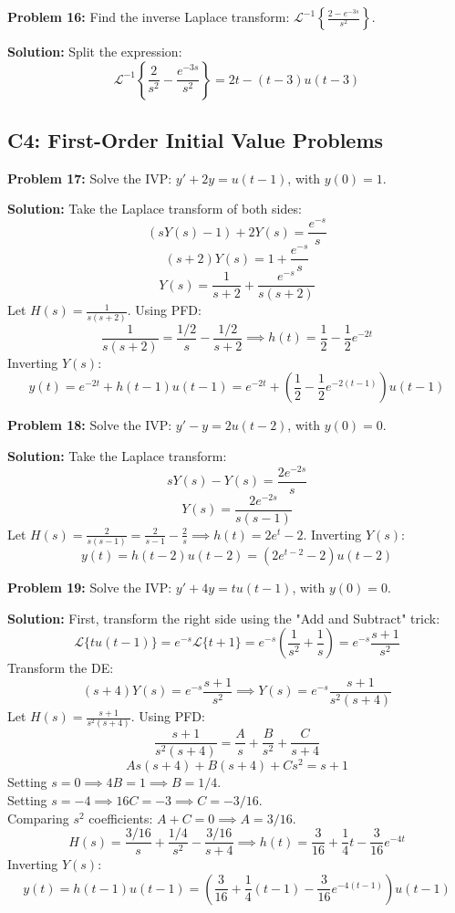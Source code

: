\documentclass[11pt, letterpaper]{article}
\theoremstyle{definition}
\theoremstyle{remark}
\newcommand{\Lap}{\mathcal{L}}
\begin{document}
\vspace{1em}
\textbf{Problem 16:} Find the inverse Laplace transform: $\Lap^{-1} \left\{ \frac{2 - e^{-3s}}{s^2} \right\}$.

\textbf{Solution:}
Split the expression:
\[ \Lap^{-1} \left\{ \frac{2}{s^2} - \frac{e^{-3s}}{s^2} \right\} = 2t - (t-3)u(t-3) \]

\subsection{C4: First-Order Initial Value Problems}

\textbf{Problem 17:} Solve the IVP: $y' + 2y = u(t-1)$, with $y(0) = 1$.

\textbf{Solution:}
Take the Laplace transform of both sides:
\[ (sY(s) - 1) + 2Y(s) = \frac{e^{-s}}{s} \]
\[ (s+2)Y(s) = 1 + \frac{e^{-s}}{s} \]
\[ Y(s) = \frac{1}{s+2} + \frac{e^{-s}}{s(s+2)} \]
Let $H(s) = \frac{1}{s(s+2)}$. Using PFD:
\[ \frac{1}{s(s+2)} = \frac{1/2}{s} - \frac{1/2}{s+2} \implies h(t) = \frac{1}{2} - \frac{1}{2}e^{-2t} \]
Inverting $Y(s)$:
\[ y(t) = e^{-2t} + h(t-1)u(t-1) = e^{-2t} + \left( \frac{1}{2} - \frac{1}{2}e^{-2(t-1)} \right) u(t-1) \]

\vspace{1em}
\textbf{Problem 18:} Solve the IVP: $y' - y = 2u(t-2)$, with $y(0) = 0$.

\textbf{Solution:}
Take the Laplace transform:
\[ sY(s) - Y(s) = \frac{2e^{-2s}}{s} \]
\[ Y(s) = \frac{2e^{-2s}}{s(s-1)} \]
Let $H(s) = \frac{2}{s(s-1)} = \frac{2}{s-1} - \frac{2}{s} \implies h(t) = 2e^t - 2$.
Inverting $Y(s)$:
\[ y(t) = h(t-2)u(t-2) = (2e^{t-2} - 2)u(t-2) \]

\vspace{1em}
\textbf{Problem 19:} Solve the IVP: $y' + 4y = t u(t-1)$, with $y(0) = 0$.

\textbf{Solution:}
First, transform the right side using the "Add and Subtract" trick:
\[ \Lap\{t u(t-1)\} = e^{-s}\Lap\{t+1\} = e^{-s} \left( \frac{1}{s^2} + \frac{1}{s} \right) = e^{-s} \frac{s+1}{s^2} \]
Transform the DE:
\[ (s+4)Y(s) = e^{-s} \frac{s+1}{s^2} \implies Y(s) = e^{-s} \frac{s+1}{s^2(s+4)} \]
Let $H(s) = \frac{s+1}{s^2(s+4)}$. Using PFD:
\[ \frac{s+1}{s^2(s+4)} = \frac{A}{s} + \frac{B}{s^2} + \frac{C}{s+4} \]
\[ A s(s+4) + B(s+4) + C s^2 = s+1 \]
Setting $s=0 \implies 4B = 1 \implies B = 1/4$. \\
Setting $s=-4 \implies 16C = -3 \implies C = -3/16$. \\
Comparing $s^2$ coefficients: $A + C = 0 \implies A = 3/16$.
\[ H(s) = \frac{3/16}{s} + \frac{1/4}{s^2} - \frac{3/16}{s+4} \implies h(t) = \frac{3}{16} + \frac{1}{4}t - \frac{3}{16}e^{-4t} \]
Inverting $Y(s)$:
\[ y(t) = h(t-1)u(t-1) = \left( \frac{3}{16} + \frac{1}{4}(t-1) - \frac{3}{16}e^{-4(t-1)} \right) u(t-1) \]
\end{document}
